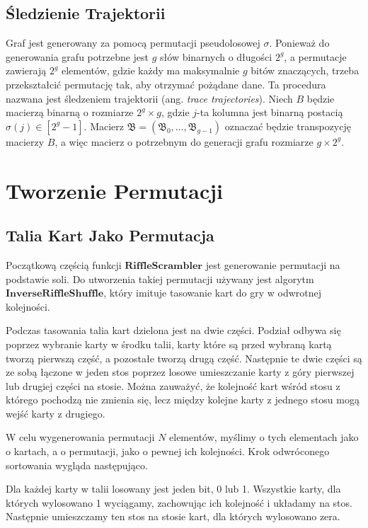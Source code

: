 \subsection{Śledzienie Trajektorii}
Graf jest generowany za pomocą permutacji pseudolosowej $\sigma$.
Ponieważ do generowania grafu potrzebne jest $g$ słów binarnych o długości $2^{g}$, a permutacje zawierają $2^{g}$ elementów, gdzie każdy ma maksymalnie $g$ bitów znaczących, trzeba przekształcić permutację tak, aby otrzymać pożądane dane.
Ta procedura nazwana jest śledzeniem trajektorii (ang. \textit{trace trajectories}).
Niech $B$ będzie macierzą binarną o rozmiarze $2^{g} \times g$, gdzie $j$-ta kolumna jest binarną postacią $\sigma(j) \in [2^{g}-1]$. Macierz $\mathfrak{B} = (\mathfrak{B}_{0},\dots,\mathfrak{B}_{g-1})$ oznaczać będzie transpozycję macierzy $B$, a więc macierz o potrzebnym do generacji grafu rozmiarze $g \times 2^{g}$.


\section{Tworzenie Permutacji}

\subsection{Talia Kart Jako Permutacja}
Początkową częścią funkcji $\mathbf{RiffleScrambler}$ jest generowanie permutacji na podstawie soli. Do utworzenia takiej permutacji używany jest algorytm $\mathbf{InverseRiffleShuffle}$, który imituje tasowanie kart do gry w odwrotnej kolejności.

Podczas tasowania talia kart dzielona jest na dwie części.
Podział odbywa się poprzez wybranie karty w środku talii, karty które są przed wybraną kartą tworzą pierwszą część, a pozostałe tworzą drugą część.
Następnie te dwie części są ze sobą łączone w jeden stos poprzez losowe umieszczanie karty z góry pierwszej lub drugiej części na stosie.
Można zauważyć, że kolejność kart wśród stosu z którego pochodzą nie zmienia się, lecz między kolejne karty z jednego stosu mogą wejść karty z drugiego.

W celu wygenerowania permutacji $N$ elementów, myślimy o tych elementach jako o kartach, a o permutacji, jako o pewnej ich kolejności.
Krok odwróconego sortowania wygląda następująco.

Dla każdej karty w talii losowany jest jeden bit, 0 lub 1. Wszystkie karty, dla których wylosowano 1 wyciągamy, zachowując ich kolejność i układamy na stos. Następnie umieszczamy ten stos na stosie kart, dla których wylosowano zera.

